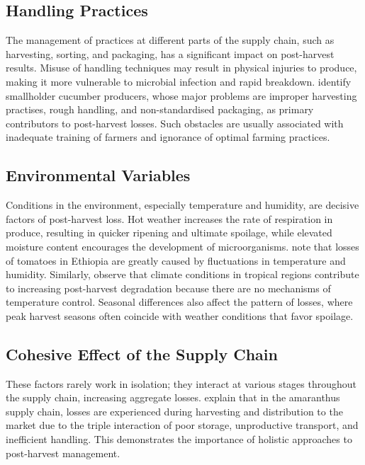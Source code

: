 \subsection{Handling Practices}

The management of practices at different parts of the supply chain, such as harvesting, sorting, and
packaging, has a significant impact on post-harvest results. Misuse of handling techniques may
result in physical injuries to produce, making it more vulnerable to microbial infection and rapid
breakdown. \cite{ukwuaba2024mitigating} identify smallholder cucumber producers, whose major
problems are improper harvesting practises, rough handling, and non-standardised packaging, as
primary contributors to post-harvest losses. Such obstacles are usually associated with inadequate
training of farmers and ignorance of optimal farming practices.

\subsection{Environmental Variables}

Conditions in the environment, especially temperature and humidity, are decisive factors of
post-harvest loss. Hot weather increases the rate of respiration in produce, resulting in quicker
ripening and ultimate spoilage, while elevated moisture content encourages the development of
microorganisms. \-\cite{wakene2024comprehensive} note that losses of tomatoes in Ethiopia are greatly
caused by fluctuations in temperature and humidity. Similarly, \cite{rajapaksha2021reducing}
observe that climate conditions in tropical regions contribute to increasing post-harvest
degradation because there are no mechanisms of temperature control. Seasonal differences also
affect the pattern of losses, where peak harvest seasons often coincide with weather conditions
that favor spoilage.

\subsection{Cohesive Effect of the Supply Chain}

These factors rarely work in isolation; they interact at various stages throughout the supply chain,
increasing aggregate losses. \cite{oluoch2024causes} explain that in the amaranthus supply chain,
losses are experienced during harvesting and distribution to the market due to the triple interaction
of poor storage, unproductive transport, and inefficient handling. This demonstrates the importance
of holistic approaches to post-harvest management.

